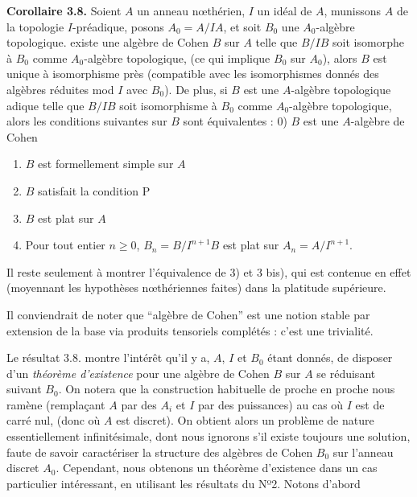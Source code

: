 \documentclass[11pt,a4paper]{article}
\begin{document}
\textbf{Corollaire 3.8.} Soient $A$ un anneau  nœthérien,
$I$ un idéal de $A$, munissons $A$ de la topologie $I$-préadique, posons
$A_0 = A/IA$, et soit $B_0$ une $A_0$-algèbre topologique. 
 existe une algèbre de Cohen $B$ sur $A$ telle que $B/IB$
soit isomorphe à $B_0$ comme $A_0$-algèbre topologique, (ce qui implique
$B_0$ \struck{\ill{}}  sur $A_0$), alors $B$ est unique à 
isomorphisme près  (compatible avec
les isomorphismes donnés des algèbres  réduites mod $I$ avec
$B_0$). De plus, si $B$ est une $A$-algèbre topologique adique telle que
$B/IB$ soit isomorphisme à $B_0$ comme $A_0$-algèbre topologique, alors les
conditions suivantes sur $B$ sont équivalentes : 0) $B$ est une $A$-algèbre de
Cohen


\begin{enumerate}
  \item[1)] $B$ est formellement simple sur $A$
  \item[2)] $B$ satisfait la condition P
  \item[3)] $B$ est plat sur $A$
  \item[3 bis)] Pour tout entier $n \geqslant 0$, $B_n = B/I^{n+1}B$ est plat
    sur $A_n = A/I^{n+1}$. 
\end{enumerate}

Il reste seulement à montrer l'équivalence de 3) et 3 bis), qui est contenue
en effet (moyennant les hypothèses nœthériennes faites) dans la platitude
supérieure.

 Il conviendrait de noter 
 que ``algèbre de Cohen'' est une notion stable par
extension de la base via produits tensoriels complétés : c'est une trivialité.

Le résultat 3.8. montre l'intérêt qu'il y a, $A$, $I$ et $B_0$ étant donnés,
de disposer d'un \emph{théorème d'existence} pour une algèbre de Cohen $B$ sur
$A$ se réduisant suivant $B_0$. On notera que la construction habituelle de
proche en proche nous ramène  (remplaçant
$A$ par des $A_i$ et $I$ par des puissances) au cas où $I$ est de carré nul,
(donc où $A$ est discret). On obtient alors un problème de nature
essentiellement infinitésimale, dont nous ignorons s'il existe toujours une
solution, faute de savoir caractériser la structure des algèbres de Cohen
$B_0$ sur l'anneau discret $A_0$. Cependant, nous obtenons  un
théorème d'existence dans un cas particulier intéressant, en utilisant les
résultats du Nº2. Notons d'abord
\end{document}
